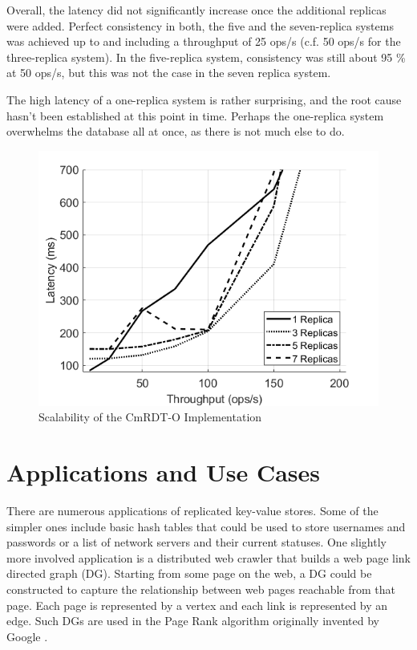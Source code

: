 \documentclass[sigconf,nonacm,10pt]{acmart}
\begin{document}
Overall, the latency did not significantly increase once the additional replicas were added. Perfect consistency in both, the five and the seven-replica systems was achieved up to and including a throughput of 25 ops/s (c.f. 50 ops/s for the three-replica system). In the five-replica system, consistency was still about 95 \% at 50 ops/s, but this was not the case in the seven replica system. 

The high latency of a one-replica system is rather surprising, and the root cause hasn't been established at this point in time. Perhaps the one-replica system overwhelms the database all at once, as there is not much else to do.

\begin{figure}[h]
  \centering
  \includegraphics[width=\linewidth]{Fig9Eval3}
  \caption{Scalability of the CmRDT-O Implementation}
  \label{fig:eval3}
\end{figure}

\section{Applications and Use Cases}
There are numerous applications of replicated key-value stores. Some of the simpler ones include basic hash tables that could be used to store usernames and passwords or a list of network servers and their current statuses. One slightly more involved application is a distributed web crawler that builds a web page link directed graph (DG). Starting from some page on the web, a DG could be constructed to capture the relationship between web pages reachable from that page. Each page is represented by a vertex and each link is represented by an edge. Such DGs are used in the Page Rank algorithm originally invented by Google \cite{brin1998anatomy}.
\end{document}
